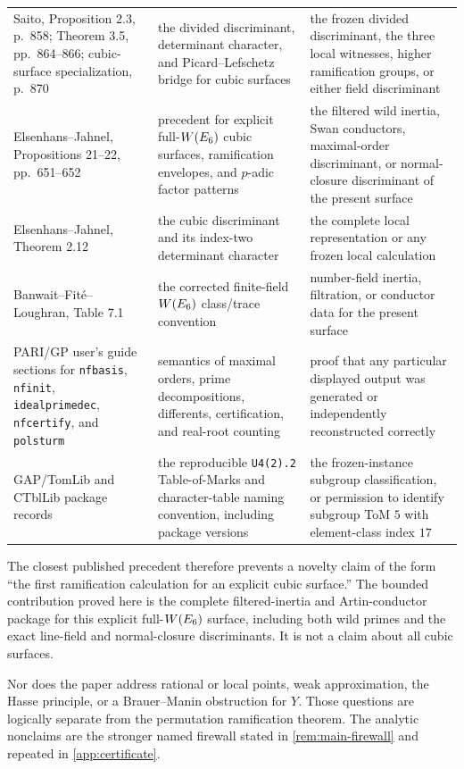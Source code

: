 \begin{longtable}{@{}>{\raggedright\arraybackslash}p{}>{\raggedright\arraybackslash}p{}>{\raggedright\arraybackslash}p{}@{}}
Saito, Proposition 2.3, p.~858; Theorem 3.5, pp.~864--866; cubic-surface
specialization, p.~870 \citep{saito2012discriminant}&the divided
discriminant, determinant character, and Picard--Lefschetz bridge for cubic
surfaces&the frozen divided discriminant, the three local witnesses, higher
ramification groups, or either field discriminant\\

Elsenhans--Jahnel, Propositions 21--22, pp.~651--652
\citep{elsenhansjahnel2009experiments}&precedent for explicit full-$W(E_6)$
cubic surfaces, ramification envelopes, and $p$-adic factor patterns&the
filtered wild inertia, Swan conductors, maximal-order discriminant, or
normal-closure discriminant of the present surface\\

Elsenhans--Jahnel, Theorem 2.12
\citep{elsenhansjahnel2012discriminant}&the cubic discriminant and its
index-two determinant character&the complete local representation or any
frozen local calculation\\

Banwait--Fit\'e--Loughran, Table 7.1
\citep{banwaitfite2019delpezzo}&the corrected finite-field $W(E_6)$
class/trace convention&number-field inertia, filtration, or conductor data
for the present surface\\

PARI/GP user's guide sections for \texttt{nfbasis}, \texttt{nfinit},
\texttt{idealprimedec}, \texttt{nfcertify}, and \texttt{polsturm}
\citep{parigroup2021}&semantics of maximal orders, prime decompositions,
differents, certification, and real-root counting&proof that any particular
displayed output was generated or independently reconstructed correctly\\

GAP/TomLib and CTblLib package records
\citep{gap2021,tomlib2019,ctbllib2020}&the reproducible
\texttt{U4(2).2} Table-of-Marks and character-table naming convention,
including package versions&the frozen-instance subgroup classification, or
permission to identify subgroup ToM $5$ with element-class index $17$\\
\bottomrule
\end{longtable}

The closest published precedent therefore prevents a novelty claim of the
form ``the first ramification calculation for an explicit cubic surface.''
The bounded contribution proved here is the complete filtered-inertia and
Artin-conductor package for this explicit full-$W(E_6)$ surface, including both
wild primes and the exact line-field and normal-closure discriminants.  It is
not a claim about all cubic surfaces.

Nor does the paper address rational or local points, weak approximation, the
Hasse principle, or a Brauer--Manin obstruction for $Y$.  Those questions are
logically separate from the permutation ramification theorem.  The analytic
nonclaims are the stronger named firewall stated in
\cref{rem:main-firewall} and repeated in \cref{app:certificate}.
